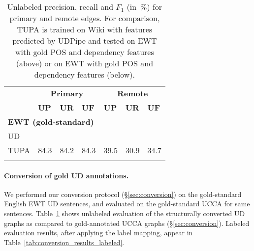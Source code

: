 \documentclass[11pt,a4paper]{article}
\begin{document}
\begin{table}[t]
\centering
\begin{tabular}{l|lll|lll}
& \multicolumn{3}{c|}{\footnotesize \bf Primary} & \multicolumn{3}{c}{\footnotesize \bf Remote} \\
& \footnotesize \textbf{UP} & \footnotesize \textbf{UR} & \footnotesize \textbf{UF}
& \footnotesize \textbf{UP} & \footnotesize \textbf{UR} & \footnotesize \textbf{UF} \\
\hline
\multicolumn{4}{l|}{\small \bf EWT (gold-standard)} & \\
\footnotesize UD
&  \\
\footnotesize TUPA
& 84.3 & 84.2 & 84.3 & 39.5 & 30.9 & 34.7 \\
\\
\end{tabular}
\caption{
Unlabeled precision, recall and $F_1$ (in~\%) for primary and remote edges.
For comparison, TUPA \protect\cite{hershcovich2017a} is trained on Wiki with features predicted by UDPipe
and tested on EWT with gold POS and dependency features (above)
or on EWT with gold POS and dependency features (below).
\label{tab:conversion_results_unlabeled}}
\end{table}



\paragraph{Conversion of gold UD annotations.}

We performed our conversion protocol (\S\ref{sec:conversion}) on the gold-standard English EWT UD sentences,
and evaluated on the gold-standard UCCA for same sentences.
Table~\ref{tab:conversion_results_unlabeled} shows unlabeled evaluation of the
structurally converted UD graphs as compared to gold-annotated UCCA graphs (\S\ref{sec:conversion}).
Labeled evaluation results, after applying the label mapping,
appear in Table~\ref{tab:conversion_results_labeled}.
\end{document}
